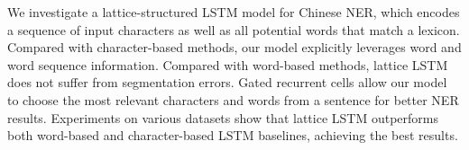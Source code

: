 We investigate a lattice-structured LSTM model for Chinese NER, which encodes a sequence of input characters as well as all potential words that match a lexicon. Compared with character-based methods, our model explicitly leverages word and word sequence information. Compared with word-based methods, lattice LSTM does not suffer from segmentation errors. Gated recurrent cells allow our model to choose the most relevant characters and words from a sentence for better NER results. Experiments on various datasets show that lattice LSTM outperforms both word-based and character-based LSTM baselines, achieving the best results.
